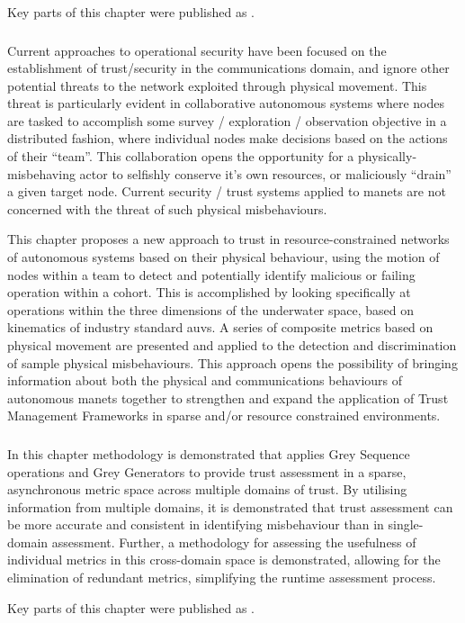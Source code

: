 Key parts of this chapter were published as .

\subsubsection{}

Current approaches to operational security have been focused on the establishment of trust/security in the communications domain, and ignore other potential threats to the network exploited through physical movement.
This threat is particularly evident in collaborative autonomous systems where nodes are tasked to accomplish some survey / exploration / observation objective in a distributed fashion, where individual nodes make decisions based on the actions of their ``team''. 
This collaboration opens the opportunity for a physically-misbehaving actor to selfishly conserve it's own resources, or maliciously ``drain'' a given target node.
Current security / trust systems applied to \glspl{manet} are not concerned with the threat of such physical misbehaviours.

This chapter proposes a new approach to trust in resource-constrained networks of autonomous systems based on their physical behaviour, using the motion of nodes within a team to detect and potentially identify malicious or failing operation within a cohort.
This is accomplished by looking specifically at operations within the three dimensions of the underwater space, based on kinematics of industry standard \glspl{auv}.
A series of composite metrics based on physical movement are presented and applied to the detection and discrimination of sample physical misbehaviours.
This approach opens the possibility of bringing information about both the physical and communications behaviours of autonomous \glspl{manet} together to strengthen and expand the application of Trust Management Frameworks in sparse and/or resource constrained environments.




\subsubsection{}

In this chapter methodology is demonstrated that applies Grey Sequence operations and Grey Generators to provide trust assessment in a sparse, asynchronous metric space across multiple domains of trust.
By utilising information from multiple domains, it is demonstrated that trust assessment can be more accurate and consistent in identifying misbehaviour than in single-domain assessment.
Further, a methodology for assessing the usefulness of individual metrics in this cross-domain space is demonstrated, allowing for the elimination of redundant metrics, simplifying the runtime assessment process.

Key parts of this chapter were published as .


